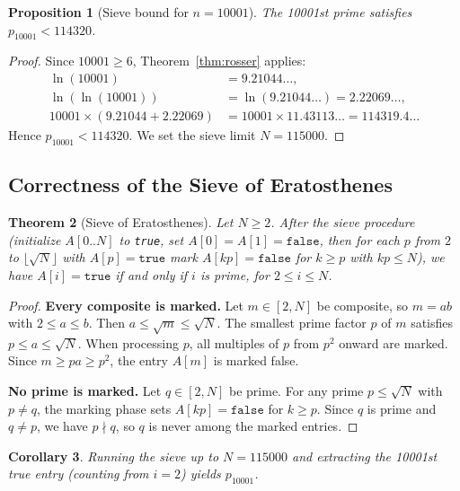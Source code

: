 \documentclass[11pt]{article}
\newtheorem{theorem}{Theorem}
\newtheorem{proposition}[theorem]{Proposition}
\newtheorem{corollary}[theorem]{Corollary}
\begin{document}
\begin{proposition}[Sieve bound for $n = 10001$]\label{prop:bound}
The 10001st prime satisfies $p_{10001} < 114320$.
\end{proposition}

\begin{proof}
Since $10001 \ge 6$, Theorem~\ref{thm:rosser} applies:
\begin{align*}
\ln(10001) &= 9.21044\ldots, \\
\ln(\ln(10001)) &= \ln(9.21044\ldots) = 2.22069\ldots, \\
10001 \times (9.21044 + 2.22069) &= 10001 \times 11.43113\ldots = 114319.4\ldots
\end{align*}
Hence $p_{10001} < 114320$. We set the sieve limit $N = 115000$.
\end{proof}

\subsection{Correctness of the Sieve of Eratosthenes}

\begin{theorem}[Sieve of Eratosthenes]\label{thm:sieve}
Let $N \ge 2$. After the sieve procedure (initialize $A[0..N]$ to \texttt{true}, set $A[0]=A[1]=\texttt{false}$, then for each $p$ from $2$ to $\lfloor\sqrt{N}\rfloor$ with $A[p]=\texttt{true}$ mark $A[kp]=\texttt{false}$ for $k \ge p$ with $kp \le N$), we have $A[i] = \texttt{true}$ if and only if $i$ is prime, for $2 \le i \le N$.
\end{theorem}

\begin{proof}
\textbf{Every composite is marked.} Let $m \in [2, N]$ be composite, so $m = ab$ with $2 \le a \le b$. Then $a \le \sqrt{m} \le \sqrt{N}$. The smallest prime factor $p$ of $m$ satisfies $p \le a \le \sqrt{N}$. When processing $p$, all multiples of $p$ from $p^2$ onward are marked. Since $m \ge pa \ge p^2$, the entry $A[m]$ is marked false.

\textbf{No prime is marked.} Let $q \in [2,N]$ be prime. For any prime $p \le \sqrt{N}$ with $p \ne q$, the marking phase sets $A[kp] = \texttt{false}$ for $k \ge p$. Since $q$ is prime and $q \ne p$, we have $p \nmid q$, so $q$ is never among the marked entries.
\end{proof}

\begin{corollary}
Running the sieve up to $N = 115000$ and extracting the 10001st true entry (counting from $i = 2$) yields $p_{10001}$.
\end{corollary}
\end{document}
